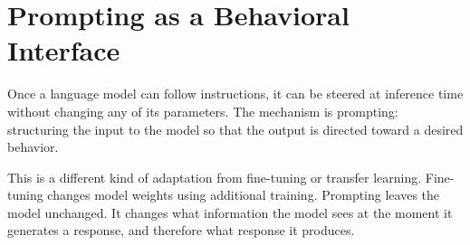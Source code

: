 \section{Prompting as a Behavioral Interface}

Once a language model can follow instructions, it can be steered at inference time without changing any of its parameters. The mechanism is prompting: structuring the input to the model so that the output is directed toward a desired behavior.

This is a different kind of adaptation from fine-tuning or transfer learning. Fine-tuning changes model weights using additional training. Prompting leaves the model unchanged. It changes what information the model sees at the moment it generates a response, and therefore what response it produces.

